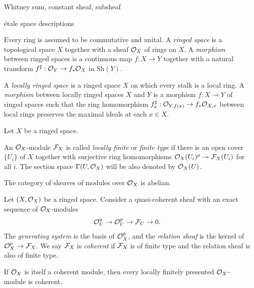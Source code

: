 \documentclass{../../large}
\newcommand{\Sh}{\mathrm{Sh}}
\begin{document}
\begin{prb}
Whitney sum, constant sheaf, subsheaf

\'etale space descriptions
\begin{parts}
\item
\end{parts}
\end{prb}


\begin{prb}
Every ring is assumed to be commutative and unital.
A \emph{ringed space} is a topological space $X$ together with a sheaf $\mathcal{O}_X$ of rings on $X$.
A \emph{morphism} between ringed spaces is a continuous map $f:X\to Y$ together with a natural transform $f^\sharp:\mathcal{O}_Y\to f_*\mathcal{O}_X$ in $\Sh(Y)$.

A \emph{locally ringed space} is a ringed space $X$ on which every stalk is a local ring.
A \emph{morphism} between locally ringed spaces $X$ and $Y$ is a morphism $f:X\to Y$ of ringed spaces such that the ring homomorphism $f^\sharp_x:\mathcal{O}_{Y,f(x)}\to f_*\mathcal{O}_{X,x}$ between local rings preserves the maximal ideals at each $x\in X$.

\end{prb}

\begin{prb}
Let $X$ be a ringed space.

An $\mathcal{O}_X$-module $\mathcal{F}_X$ is called \emph{locally finite} or \emph{finite type} if there is an open cover $\{U_i\}$ of $X$ together with surjective ring homomorphisms $\mathcal{O}_X(U_i)^p\twoheadrightarrow\mathcal{F}_X(U_i)$ for all $i$.
The section space $\Gamma(U,\mathcal{O}_X)$ will be also denoted by $\mathcal{O}_X(U)$.
\begin{parts}
\item The category of sheaves of modules over $\mathcal{O}_X$ is abelian.
\end{parts}
\end{prb}



\begin{prb}
Let $(X,\mathcal{O}_X)$ be a ringed space.
Consider a quasi-coherent sheaf with an exact sequence of $\mathcal{O}_X$-modules
\[\mathcal{O}_U^q\to\mathcal{O}_U^p\to\mathcal{F}_U\to0.\]
The \emph{generating system} is the basis of $\mathcal{O}_X^p$, and the \emph{relation sheaf} is the kernel of $\mathcal{O}_X^p\to\mathcal{F}_X$.
We say $\mathcal{F}_X$ is \emph{coherent} if $\mathcal{F}_X$ is of finite type and the relation sheaf is also of finite type.
\begin{parts}
\item If $\mathcal{O}_X$ is itself a coherent module, then every locally finitely presented $\mathcal{O}_X$-module is coherent.
\end{parts}
\end{prb}
\end{document}

